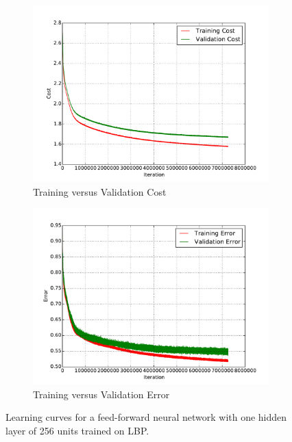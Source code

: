 \begin{figure}[H]
	\centering
	\begin{subfigure}[b]{0.45\linewidth}
		\centering
		\includegraphics[width=\linewidth]{images/1/train_val_cost.pdf}
		\caption{Training versus Validation Cost}
	\end{subfigure}
	\hfill
	\begin{subfigure}[b]{0.45\linewidth}
		\centering
		\includegraphics[width=\linewidth]{images/1/train_val_error.pdf}
		\caption{Training versus Validation Error}
	\end{subfigure}
	\caption{Learning curves for a feed-forward neural network with one hidden layer of 256 units trained on LBP.}
	\label{shrine1_curves}
\end{figure}
